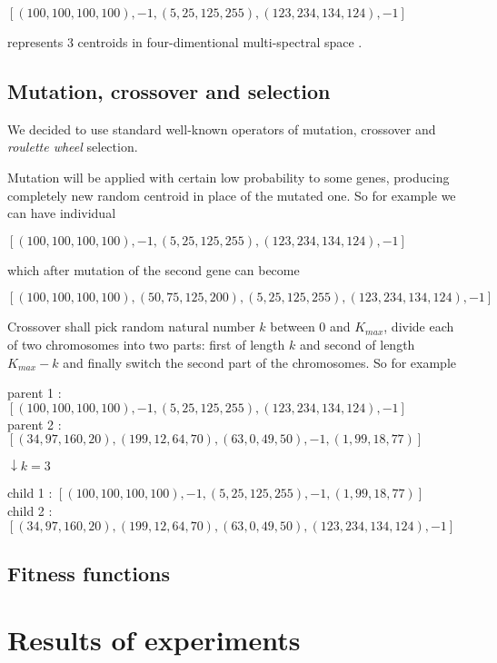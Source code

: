 \documentclass[11pt,leqno]{article}
\theoremstyle{mytheoremstyle}
\theoremstyle{mytheoremstyle}
\begin{document}
\begin{center}
$[(100,100,100,100), -1, (5,25,125,255), (123,234,134,124), -1]$
\end{center}

\noindent represents 3 centroids in four-dimentional multi-spectral space  .

\subsection{Mutation, crossover and selection}

We decided to use standard well-known operators of mutation, crossover and \textit{roulette wheel} selection. 

Mutation will be applied with certain low probability to some genes, producing completely new random centroid in place of the mutated one. So for example we can have individual

\begin{center}
$[(100,100,100,100), -1, (5,25,125,255), (123,234,134,124), -1]$
\end{center}

\noindent which after mutation of the second gene can become

\begin{center}
$[(100,100,100,100), (50, 75, 125, 200), (5,25,125,255), (123,234,134,124), -1]$
\end{center}

Crossover shall pick random natural number $k$ between 0 and $K_{max}$, divide each of two chromosomes into two parts: first of length $k$ and second of length $K_{max} - k$ and finally switch the second part of the chromosomes. So for example

\begin{center}
parent 1 : $[(100,100,100,100), -1, (5,25,125,255), (123,234,134,124), -1]$\\
parent 2 : $[(34,97,160,20), (199,12,64,70), (63,0,49,50), -1, (1,99,18,77)]$


$\downarrow k = 3$

child 1 : $[(100,100,100,100), -1, (5,25,125,255), -1, (1,99,18,77)]$\\
child 2 : $[(34,97,160,20), (199,12,64,70), (63,0,49,50), (123,234,134,124), -1]$
\end{center}

\subsection{Fitness functions}

\section{Results of experiments}
\end{document}
